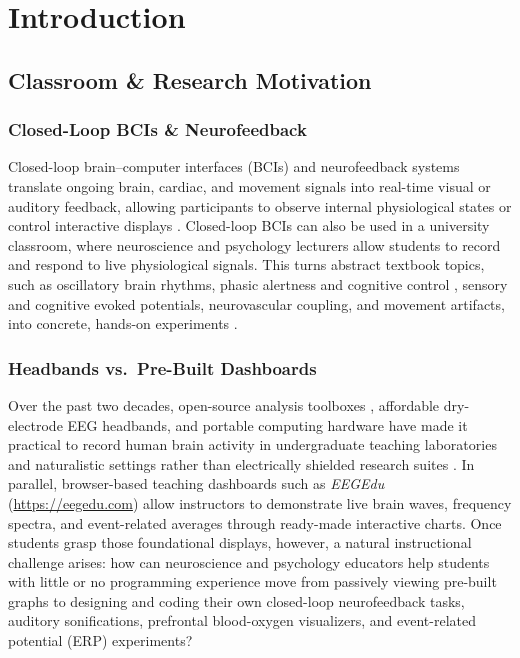\documentclass[11pt]{article}
\begin{document}
\clearpage
\setcounter{tocdepth}{3}
\tableofcontents
\clearpage

\section{Introduction}

\subsection{Classroom \& Research Motivation}

\subsubsection{Closed-Loop BCIs \& Neurofeedback}
Closed-loop brain--computer interfaces (BCIs) and neurofeedback systems translate ongoing brain, cardiac, and movement signals into real-time visual or auditory feedback, allowing participants to observe internal physiological states or control interactive displays \citep{sitaram2017closed,enriquez2017eeg,lotte2013flaws}. Closed-loop BCIs can also be used in a university classroom, where neuroscience and psychology lecturers allow students to record and respond to live physiological signals. This turns abstract textbook topics, such as oscillatory brain rhythms, phasic alertness and cognitive control \citep{dekleijn2023short,dekleijn2025phasic}, sensory and cognitive evoked potentials, neurovascular coupling, and movement artifacts, into concrete, hands-on experiments \citep{mathewson2024moving,miranda2014brain,janssen2021opportunities}.

\subsubsection{Headbands vs.\ Pre-Built Dashboards}
Over the past two decades, open-source analysis toolboxes \citep{delorme2004eeglab,makowski2021neurokit2,cannard2024brainbeats}, affordable dry-electrode EEG headbands, and portable computing hardware have made it practical to record human brain activity in undergraduate teaching laboratories and naturalistic settings rather than electrically shielded research suites \citep{krigolson2017choosing,mathewson2017high,kuziek2017transitioning,kuziek2018increasing,cannard2021validating,sabio2024scoping,vanbueren2026comparing}. In parallel, browser-based teaching dashboards such as \emph{EEGEdu} (\url{https://eegedu.com}) \citep{mathewson2026eegedu} allow instructors to demonstrate live brain waves, frequency spectra, and event-related averages through ready-made interactive charts. Once students grasp those foundational displays, however, a natural instructional challenge arises: how can neuroscience and psychology educators help students with little or no programming experience move from passively viewing pre-built graphs to designing and coding their own closed-loop neurofeedback tasks, auditory sonifications, prefrontal blood-oxygen visualizers, and event-related potential (ERP) experiments?
\end{document}
